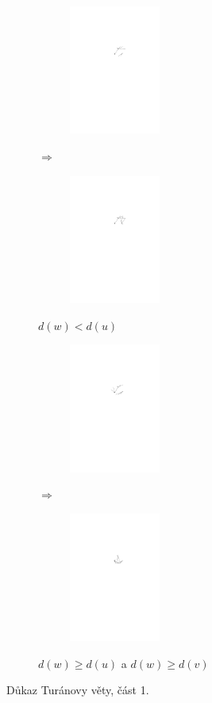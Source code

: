 \begin{figure}[h]
\centering
\begin{subfigure}{8cm}
\begin{subfigure}{3cm}
\includegraphics[width=3cm]{img/turan1.pdf}
\end{subfigure}
\hspace{0.5cm}$\Rightarrow$\hspace{0.5cm}
\begin{subfigure}{3cm}
\includegraphics[width=3cm]{img/turan2.pdf}
\end{subfigure}
\caption{$d(w) < d(u)$}
\end{subfigure}
\hfill
\begin{subfigure}{8cm}
\begin{subfigure}{3cm}
\includegraphics[width=3cm]{img/turan3.pdf}
\end{subfigure}
\hspace{0.5cm}$\Rightarrow$\hspace{0.5cm}
\begin{subfigure}{3cm}
\includegraphics[width=3cm]{img/turan4.pdf}
\end{subfigure}
\caption{$d(w) \ge d(u)$ a $d(w) \ge d(v)$}
\end{subfigure}
\caption{Důkaz Turánovy věty, část 1.}
\end{figure}

